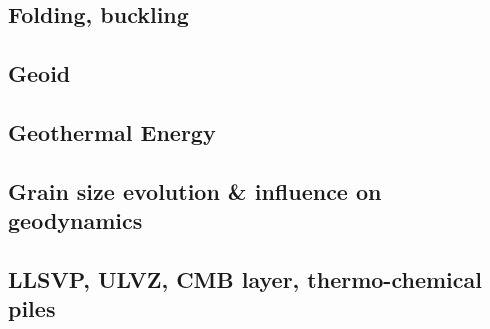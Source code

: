\subsection*{Folding, buckling}
 


\noindent
\cite{ramb68}
\cite{ramb70}
\cite{ramb71}
\cite{flet91}
\cite{zhhj93}
\cite{flet95}
\cite{zhho96}
\cite{frsc06}
\cite{schm08}
\cite{resb10}
\cite{freh11}
\cite{reds12}\cite{grsc12}
\cite{regc13}
\cite{freh14}\cite{frex14}
\cite{frsc16}


\subsection*{Geoid}

\cite{davi84}\cite{hage84}
\cite{davi86}
\cite{zhgu92}\cite{kiha92}
\cite{zhch93}\cite{rirl93}
\cite{kiha94}
\cite{king95}
\cite{mogu96}
\cite{cava98}\cite{chki98}
\cite{king09}
\cite{hibi12}
\cite{grab17}
\cite{king18}

\subsection*{Geothermal Energy}

\cite{revf19}

\subsection*{Grain size evolution \& influence on geodynamics}

\cite{brcp99}
\cite{dets01}
\cite{soet02}
\cite{hapa03}
\cite{rorb11}
\cite{beri13}
\cite{besr14}
\cite{thrk15}\cite{tukb15}\cite{pevp15}
\cite{ceww17}\cite{daef17}\cite{mube17}
\cite{bemu18}\cite{bezb18}\cite{mube18}


\subsection*{LLSVP, ULVZ, CMB layer, thermo-chemical piles}

